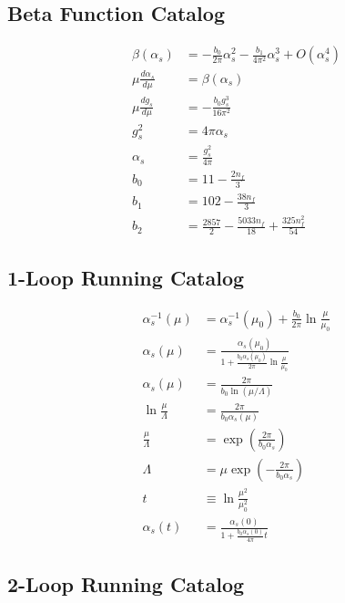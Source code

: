 \documentclass[11pt,a4paper]{article}
\theoremstyle{definition}
\begin{document}
\subsection{Beta Function Catalog}
\label{subsec:ext-beta}

\begin{align}
\label{eq:ext-9}
\beta(\alpha_s) &= -\frac{b_0}{2\pi}\alpha_s^2 - \frac{b_1}{4\pi^2}\alpha_s^3 + O(\alpha_s^4) \\
\label{eq:ext-10}
\mu\frac{d\alpha_s}{d\mu} &= \beta(\alpha_s) \\
\label{eq:ext-11}
\mu\frac{dg_s}{d\mu} &= -\frac{b_0 g_s^3}{16\pi^2} \\
\label{eq:ext-12}
g_s^2 &= 4\pi\alpha_s \\
\label{eq:ext-13}
\alpha_s &= \frac{g_s^2}{4\pi} \\
\label{eq:ext-14}
b_0 &= 11 - \frac{2n_f}{3} \\
\label{eq:ext-15}
b_1 &= 102 - \frac{38n_f}{3} \\
\label{eq:ext-16}
b_2 &= \frac{2857}{2} - \frac{5033n_f}{18} + \frac{325n_f^2}{54}
\end{align}

\subsection{1-Loop Running Catalog}
\label{subsec:ext-1loop}

\begin{align}
\label{eq:ext-17}
\alpha_s^{-1}(\mu) &= \alpha_s^{-1}(\mu_0) + \frac{b_0}{2\pi}\ln\frac{\mu}{\mu_0} \\
\label{eq:ext-18}
\alpha_s(\mu) &= \frac{\alpha_s(\mu_0)}{1 + \frac{b_0\alpha_s(\mu_0)}{2\pi}\ln\frac{\mu}{\mu_0}} \\
\label{eq:ext-19}
\alpha_s(\mu) &= \frac{2\pi}{b_0\ln(\mu/\Lambda)} \\
\label{eq:ext-20}
\ln\frac{\mu}{\Lambda} &= \frac{2\pi}{b_0\alpha_s(\mu)} \\
\label{eq:ext-21}
\frac{\mu}{\Lambda} &= \exp\left(\frac{2\pi}{b_0\alpha_s}\right) \\
\label{eq:ext-22}
\Lambda &= \mu\exp\left(-\frac{2\pi}{b_0\alpha_s}\right) \\
\label{eq:ext-23}
t &\equiv \ln\frac{\mu^2}{\mu_0^2} \\
\label{eq:ext-24}
\alpha_s(t) &= \frac{\alpha_s(0)}{1 + \frac{b_0\alpha_s(0)}{4\pi}t}
\end{align}

\subsection{2-Loop Running Catalog}
\label{subsec:ext-2loop}
\end{document}
